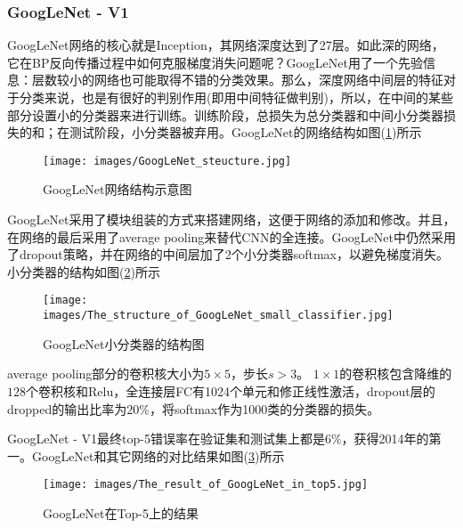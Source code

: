         \subsubsection{GoogLeNet - V1}
            \par
            GoogLeNet\cite{2014.Christian}网络的核心就是Inception，其网络深度达到了27层。如此深的网络，它在BP反向传播过程中如何克服梯度消失问题呢？GoogLeNet用了一个先验信息：层数较小的网络也可能取得不错的分类效果。那么，深度网络中间层的特征对于分类来说，也是有很好的判别作用(即用中间特征做判别)，所以，在中间的某些部分设置小的分类器来进行训练。训练阶段，总损失为总分类器和中间小分类器损失的和；在测试阶段，小分类器被弃用。GoogLeNet的网络结构如图(\ref{fig:GoogLeNet网络结构示意图})所示
             \begin{figure}[H]
            \centering
            \texttt{[image: images/GoogLeNet\_steucture.jpg]}
            \caption{GoogLeNet网络结构示意图}
            \label{fig:GoogLeNet网络结构示意图}
            \end{figure}
            GoogLeNet采用了模块组装的方式来搭建网络，这便于网络的添加和修改。并且，在网络的最后采用了average pooling来替代CNN的全连接。GoogLeNet中仍然采用了dropout策略，并在网络的中间层加了2个小分类器softmax，以避免梯度消失。小分类器的结构如图(\ref{fig:GoogLeNet小分类器的结构图})所示
             \begin{figure}[H]
            \centering
            \texttt{[image: images/The\_structure\_of\_GoogLeNet\_small\_classifier.jpg]}
            \caption{GoogLeNet小分类器的结构图}
            \label{fig:GoogLeNet小分类器的结构图}
            \end{figure}
            average pooling部分的卷积核大小为$5\times 5$，步长$s >3$。
            $1\times 1$的卷积核包含降维的$128$个卷积核和Relu，全连接层FC有1024个单元和修正线性激活，dropout层的dropped的输出比率为$20\%$，将softmax作为1000类的分类器的损失。
            \par
            GoogLeNet - V1最终top-5错误率在验证集和测试集上都是$6\%$，获得2014年的第一。GoogLeNet和其它网络的对比结果如图(\ref{fig:GoogLeNet在Top-5上的结果})所示
             \begin{figure}[H]
            \centering
            \texttt{[image: images/The\_result\_of\_GoogLeNet\_in\_top5.jpg]}
            \caption{GoogLeNet在Top-5上的结果}
            \label{fig:GoogLeNet在Top-5上的结果}
            \end{figure}

